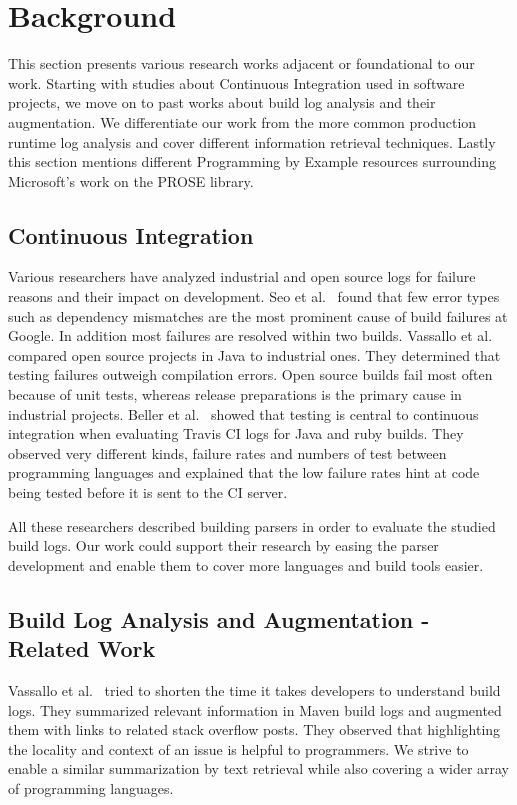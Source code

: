 \documentclass[\myrootdir/main.tex]{subfiles}
\begin{document}
\chapter{Background}
\label{sec:rw}
This section presents various research works adjacent or foundational to our work. Starting with studies about Continuous Integration used in software projects, we move on to past works about build log analysis and their augmentation. We differentiate our work from the more common production runtime log analysis and cover different information retrieval techniques. Lastly this section mentions different Programming by Example resources surrounding Microsoft's work on the PROSE library.

\section{Continuous Integration}
Various researchers have analyzed industrial and open source logs for failure reasons and their impact on development. Seo et al.~\cite{seo2014programmers} found that few error types such as dependency mismatches are the most prominent cause of build failures at Google. In addition most failures are resolved within two builds. Vassallo et al.~\cite{vassallo2017a-tale} compared open source projects in Java to industrial ones. They determined that testing failures outweigh compilation errors. Open source builds fail most often because of unit tests, whereas release preparations is the primary cause in industrial projects. Beller et al.~\cite{beller2017oops} showed that testing is central to continuous integration when evaluating Travis CI logs for Java and ruby builds. They observed very different kinds, failure rates and numbers of test between programming languages and explained that the low failure rates hint at code being tested before it is sent to the CI server.

All these researchers described building parsers in order to evaluate the studied build logs. Our work could support their research by easing the parser development and enable them to cover more languages and build tools easier.

\section{Build Log Analysis and Augmentation - Related Work}
\label{sec:rw-bl-analysis}
Vassallo et al.~\cite{vassallo2018un-break} tried to shorten the time it takes developers to understand build logs. They summarized relevant information in Maven build logs and augmented them with links to related stack overflow posts. They observed that highlighting the locality and context of an issue is helpful to programmers. We strive to enable a similar summarization by text retrieval while also covering a wider array of programming languages.
\end{document}
